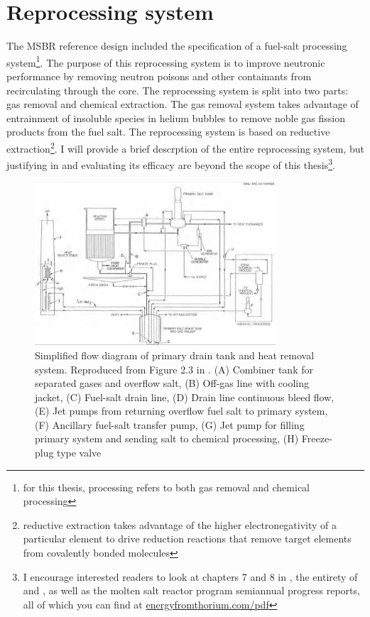 \section{Reprocessing system}
\label{sec:msbr-reprocessing-system}
The MSBR reference design included the specification of a fuel-salt processing
system\footnote{for this thesis, processing refers to both gas removal and
chemical processing}. The purpose of this reprocessing system is to improve
neutronic performance by removing neutron poisons and other containants from
recirculating through the core. The reprocessing system is split into two parts:
gas removal and chemical extraction. The gas removal system takes advantage
of entrainment of insoluble species in helium bubbles to remove noble gas
fission products from the fuel salt. The reprocessing system is based on
reductive extraction\footnote{reductive extraction takes advantage of the higher
electronegativity of a particular element to drive reduction reactions that
remove target elements from covalently bonded molecules}. I will provide a brief
descrption of the entire reprocessing system, but justifying in and evaluating
its efficacy are beyond the scope of this thesis\footnote{I encourage interested
readers to look at chapters 7 and 8 in \cite{robertson_conceptual_1971}, the
entirety of \cite{carter_design_1972} and \cite{lindauer_design_1969}, as well
as the molten salt reactor program semiannual progress reports, all of which you
can find at \url{energyfromthorium.com/pdf}}.

\begin{figure}[htpb]
    \centering
    \includegraphics[width=0.8\textwidth]{figs/ch4/msbr_primary_system.png}
    \caption{Simplified flow diagram of primary drain tank and heat removal
    system. Reproduced from Figure 2.3 in \cite{robertson_conceptual_1971}. (A)
    Combiner tank for separated gases and overflow salt, (B) Off-gas line with
    cooling jacket, (C) Fuel-salt drain line, (D) Drain line continuous bleed
    flow, (E) Jet pumps from returning overflow fuel salt to primary system, (F)
    Ancillary fuel-salt transfer pump, (G) Jet pump for filling primary system
    and sending salt to chemical processing, (H) Freeze-plug type valve }
    \label{fig:msbr_primary_system}
\end{figure}


